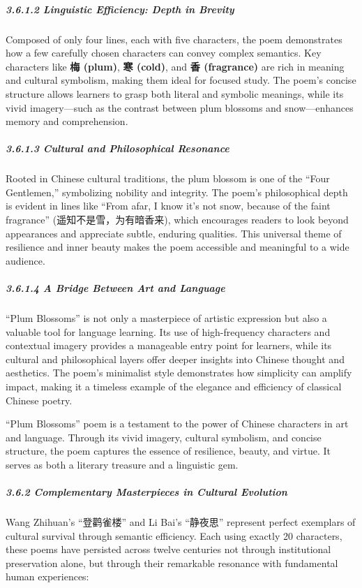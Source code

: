 \documentclass[
  11pt,
  letterpaper,
]{article}
\begin{document}
\subparagraph{3.6.1.2 Linguistic Efficiency: Depth in
Brevity}\label{linguistic-efficiency-depth-in-brevity}

Composed of only four lines, each with five characters, the poem
demonstrates how a few carefully chosen characters can convey complex
semantics. Key characters like \textbf{梅 (plum)}, \textbf{寒 (cold)},
and \textbf{香 (fragrance)} are rich in meaning and cultural symbolism,
making them ideal for focused study. The poem's concise structure allows
learners to grasp both literal and symbolic meanings, while its vivid
imagery---such as the contrast between plum blossoms and snow---enhances
memory and comprehension.

\subparagraph{3.6.1.3 Cultural and Philosophical
Resonance}\label{cultural-and-philosophical-resonance}

Rooted in Chinese cultural traditions, the plum blossom is one of the
``Four Gentlemen,'' symbolizing nobility and integrity. The poem's
philosophical depth is evident in lines like ``From afar, I know it's
not snow, because of the faint fragrance'' (遥知不是雪，为有暗香来),
which encourages readers to look beyond appearances and appreciate
subtle, enduring qualities. This universal theme of resilience and inner
beauty makes the poem accessible and meaningful to a wide audience.

\subparagraph{3.6.1.4 A Bridge Between Art and
Language}\label{a-bridge-between-art-and-language}

``Plum Blossoms'' is not only a masterpiece of artistic expression but
also a valuable tool for language learning. Its use of high-frequency
characters and contextual imagery provides a manageable entry point for
learners, while its cultural and philosophical layers offer deeper
insights into Chinese thought and aesthetics. The poem's minimalist
style demonstrates how simplicity can amplify impact, making it a
timeless example of the elegance and efficiency of classical Chinese
poetry.

``Plum Blossoms'' poem is a testament to the power of Chinese characters
in art and language. Through its vivid imagery, cultural symbolism, and
concise structure, the poem captures the essence of resilience, beauty,
and virtue. It serves as both a literary treasure and a linguistic gem.

\subparagraph{3.6.2 Complementary Masterpieces in Cultural
Evolution}\label{complementary-masterpieces-in-cultural-evolution}

Wang Zhihuan's ``登鹳雀楼'' and Li Bai's ``静夜思'' represent perfect
exemplars of cultural survival through semantic efficiency. Each using
exactly 20 characters, these poems have persisted across twelve
centuries not through institutional preservation alone, but through
their remarkable resonance with fundamental human experiences:
\end{document}
